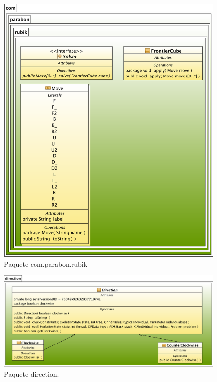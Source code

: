 \begin{figure}[bct]
\centering
\includegraphics[scale=0.10]{figs/classes/rubik}
\caption{Paquete com.parabon.rubik}
\label{fig:package-rubik}
\end{figure}

\begin{figure}[cbt]
\centering
\includegraphics[scale=0.12]{figs/classes/direction}
\caption{Paquete direction.}
\label{fig:package-direction}
\end{figure}

